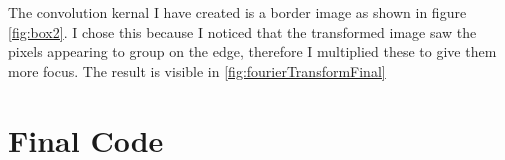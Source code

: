 \documentclass{article}
\begin{document}
The convolution kernal I have created is a border image as shown in figure \ref{fig:box2}. I chose this because I noticed that the transformed image saw the pixels appearing to group on the edge, therefore I multiplied these to give them more focus. The result is visible in \ref{fig:fourierTransformFinal}

\pagebreak

\section{Final Code}



\pagebreak

\printbibliography
\end{document}
